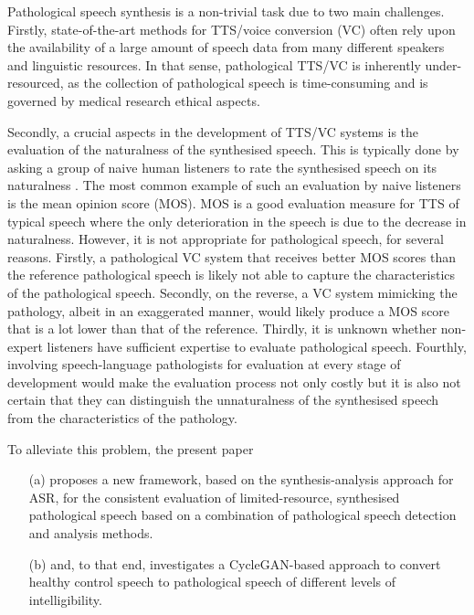 \documentclass[a4paper]{article}
\begin{document}
Pathological speech synthesis is a non-trivial task due to two main challenges. Firstly, state-of-the-art methods for TTS/voice conversion (VC) often rely upon the availability of a large amount of speech data from many different speakers and linguistic resources. In that sense, pathological TTS/VC is inherently under-resourced, as the collection of pathological speech is time-consuming and is governed by medical research ethical aspects.

Secondly, a crucial aspects in the development of TTS/VC systems is the evaluation of the naturalness of the synthesised speech. This is typically done by asking a group of naive human listeners to rate the synthesised speech on its naturalness \cite{wu2019blizzard}. The most common example of such an evaluation by naive listeners is the mean opinion score (MOS). MOS is a good evaluation measure for TTS of typical speech where the only deterioration in the speech is due to the decrease in naturalness. However, it is not appropriate for pathological speech, for several reasons. Firstly, a pathological VC system that receives better MOS scores than the reference pathological speech is likely not able to capture the characteristics of the pathological speech. Secondly, on the reverse, a VC system mimicking the pathology, albeit in an exaggerated manner, would likely produce a MOS score that is a lot lower than that of the reference. Thirdly, it is unknown whether non-expert listeners have sufficient expertise to evaluate pathological speech. Fourthly, involving speech-language pathologists for evaluation at every stage of development would make the evaluation process not only costly but it is also not certain that they can distinguish the unnaturalness of the synthesised speech from the characteristics of the pathology.

To alleviate this problem, the present paper
\begin{itemize}
    \item[(a)] proposes a new framework, based on the synthesis-analysis approach for ASR, for the consistent evaluation of limited-resource, synthesised pathological speech based on a combination of pathological speech detection and analysis methods.
    \item[(b)] and, to that end, investigates a CycleGAN-based approach to convert healthy control speech to pathological speech of different levels of intelligibility.
    
\end{itemize}
\end{document}
